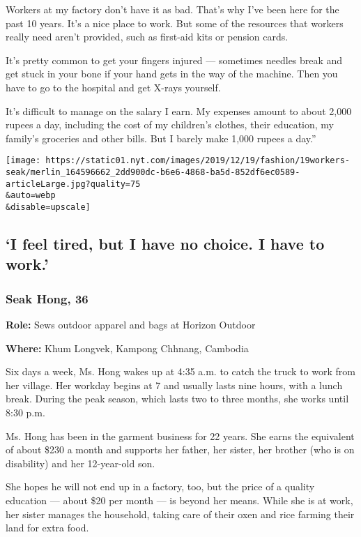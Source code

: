 Workers at my factory don't have it as bad. That's why I've been here
for the past 10 years. It's a nice place to work. But some of the
resources that workers really need aren't provided, such as first-aid
kits or pension cards.

It's pretty common to get your fingers injured --- sometimes needles
break and get stuck in your bone if your hand gets in the way of the
machine. Then you have to go to the hospital and get X-rays yourself.

It's difficult to manage on the salary I earn. My expenses amount to
about 2,000 rupees a day, including the cost of my children's clothes,
their education, my family's groceries and other bills. But I barely
make 1,000 rupees a day.''

\texttt{[image: https://static01.nyt.com/images/2019/12/19/fashion/19workers-seak/merlin\_164596662\_2dd900dc-b6e6-4868-ba5d-852df6ec0589-articleLarge.jpg?quality=75\\\&auto=webp\\\&disable=upscale]}

\hypertarget{i-feel-tired-but-i-have-no-choice-i-have-to-work}{%
\subsection{`I feel tired, but I have no choice. I have to
work.'}\label{i-feel-tired-but-i-have-no-choice-i-have-to-work}}

\hypertarget{seak-hong-36}{%
\subsubsection{Seak Hong, 36}\label{seak-hong-36}}

\textbf{Role:} Sews outdoor apparel and bags at Horizon Outdoor

\textbf{Where:} Khum Longvek, Kampong Chhnang, Cambodia

Six days a week, Ms. Hong wakes up at 4:35 a.m. to catch the truck to
work from her village. Her workday begins at 7 and usually lasts nine
hours, with a lunch break. During the peak season, which lasts two to
three months, she works until 8:30 p.m.

Ms. Hong has been in the garment business for 22 years. She earns the
equivalent of about \$230 a month and supports her father, her sister,
her brother (who is on disability) and her 12-year-old son.

She hopes he will not end up in a factory, too, but the price of a
quality education --- about \$20 per month --- is beyond her means.
While she is at work, her sister manages the household, taking care of
their oxen and rice farming their land for extra food.

